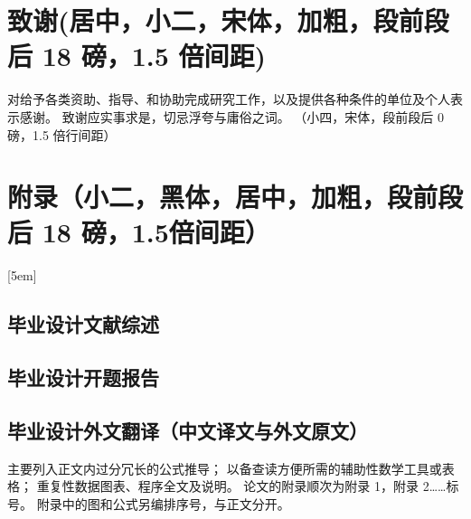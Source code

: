 \documentclass[12pt]{zjutbook}
\begin{document}
\backmatter



\chapter{致谢(居中，小二，宋体，加粗，段前段后 18 磅，1.5 倍间距)}
对给予各类资助、指导、和协助完成研究工作，以及提供各种条件的单位及个人表示感谢。
致谢应实事求是，切忌浮夸与庸俗之词。
（小四，宋体，段前段后 0 磅，1.5 倍行间距）


\appendix
\chapter{附录（小二，黑体，居中，加粗，段前段后 18 磅，1.5倍间距）}
 {%
[5em]{}{\contentslabel{3.5em}}{}{}
\section{毕业设计文献综述}
\section{毕业设计开题报告}
\section{毕业设计外文翻译（中文译文与外文原文）}

主要列入正文内过分冗长的公式推导；
以备查读方便所需的辅助性数学工具或表格；
重复性数据图表、程序全文及说明。
论文的附录顺次为附录 1，附录 2……标号。
附录中的图和公式另编排序号，与正文分开。
}
\end{document}
